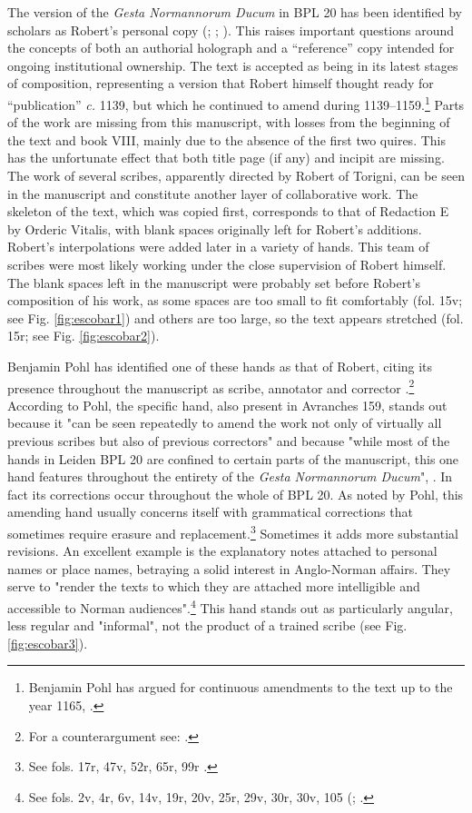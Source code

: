 \documentclass{article}
\begin{document}
The version of the \emph{Gesta Normannorum Ducum} in BPL 20 has been
identified by scholars as Robert's personal copy (\cite[cix, cxxvi]{van_houts_gesta_1992}; \cite[95]{cleaver_autograph_2018}; \cite[59]{pohl_abbas_2014}). This raises important questions
around the concepts of both an authorial holograph and a ``reference''
copy intended for ongoing institutional ownership. The text is accepted
as being in its latest stages of composition, representing a version
that Robert himself thought ready for ``publication'' \emph{c.} 1139, but
which he continued to amend during 1139--1159.\footnote{Benjamin Pohl has
  argued for continuous amendments to the text up to the year 1165,
  \citep[52, 59, 63]{pohl_abbas_2014}.} Parts of the work are missing from this
manuscript, with losses from the beginning of the text and book VIII,
mainly due to the absence of the first two quires. This has the
unfortunate effect that both title page (if any) and incipit are
missing. The work of several scribes, apparently directed by Robert of
Torigni, can be seen in the manuscript and constitute another layer of
collaborative work. The skeleton of the text, which was copied first,
corresponds to that of Redaction E by Orderic Vitalis, with blank spaces
originally left for Robert's additions. Robert's interpolations were
added later in a variety of hands. This team of scribes were most likely
working under the close supervision of Robert himself. The blank spaces
left in the manuscript were probably set before Robert's composition of
his work, as some spaces are too small to fit comfortably (fol. 15v; see
Fig. \ref{fig:escobar1}) and others are too large, so the text appears stretched (fol.
15r; see Fig. \ref{fig:escobar2}).

Benjamin Pohl has identified one of these hands as that of Robert,
citing its presence throughout the manuscript as scribe, annotator and
corrector \citep[58--64]{pohl_abbas_2014}.\footnote{For a counterargument see:
  \cite{bisson_scripts_2019}.} According to Pohl, the specific hand, also present in
Avranches 159, stands out because it "can be seen repeatedly to amend the
work not only of virtually all previous scribes but also of previous
correctors" and because "while most of the hands in Leiden BPL 20 are
confined to certain parts of the manuscript, this one hand features
throughout the entirety of the \emph{Gesta Normannorum Ducum}", \citep[60]{pohl_abbas_2014}. In fact its corrections occur throughout the whole of BPL 20.
As noted by Pohl, this amending hand usually concerns itself with
grammatical corrections that sometimes require erasure and
replacement.\footnote{See fols. 17r, 47v, 52r, 65r, 99r \citep[60]{pohl_abbas_2014}.}
Sometimes it adds more substantial revisions. An excellent example is
the explanatory notes attached to personal names or place names,
betraying a solid interest in Anglo-Norman affairs. They serve to
"render the texts to which they are attached more intelligible and
accessible to Norman audiences".\footnote{See fols. 2v, 4r, 6v, 14v,
  19r, 20v, 25r, 29v, 30r, 30v, 105 (\cite[60]{pohl_abbas_2014}; \cite[217]{van_houts_robert_1989}.} This hand stands out as particularly angular, less regular and
"informal", not the product of a trained scribe (see Fig. \ref{fig:escobar3}).
\end{document}

